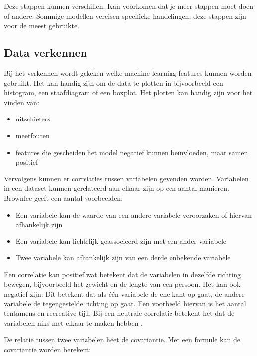 Deze stappen kunnen verschillen.
Kan voorkomen dat je meer stappen moet doen of andere.
Sommige modellen vereisen specifieke handelingen, deze stappen zijn voor de meest gebruikte.

\subsection{Data verkennen}\label{subsec:data-verkennen}
Bij het verkennen wordt gekeken welke \glspl{machine-learning-feature} kunnen worden gebruikt. Het kan handig zijn om de data te plotten in bijvoorbeeld een histogram, een staafdiagram of een boxplot. \cite{data-science-primer} Het plotten kan handig zijn voor het vinden van:

\begin{itemize}
  \item uitschieters
  \item meetfouten
  \item features die gescheiden het model negatief kunnen beïnvloeden, maar samen positief
\end{itemize}

Vervolgens kunnen er correlaties tussen variabelen gevonden worden. Variabelen in een dataset kunnen gerelateerd aan elkaar zijn op een aantal manieren. Brownlee \cite{ml-correlation-brownlee} geeft een aantal voorbeelden:

\begin{itemize}
  \item Een variabele kan de waarde van een andere variabele veroorzaken of hiervan afhankelijk zijn
  \item Een variabele kan lichtelijk geassocieerd zijn met een ander variabele
  \item Twee variabele kan afhankelijk zijn van een derde onbekende variabele
\end{itemize}

Een correlatie kan positief wat betekent dat de variabelen in dezelfde richting bewegen, bijvoorbeeld het gewicht en de lengte van een persoon. Het kan ook negatief zijn. Dit betekent dat als één variabele de ene kant op gaat, de andere variabele de tegengestelde richting op gaat. Een voorbeeld hiervan is het aantal tentamens en recreative tijd. Bij een neutrale correlatie betekent het dat de variabelen niks met elkaar te maken hebben \cite{ml-correlation-brownlee}.

De relatie tussen twee variabelen heet de \gls{covariantie}. Met een formule kan de \gls{covariantie} worden berekent:

